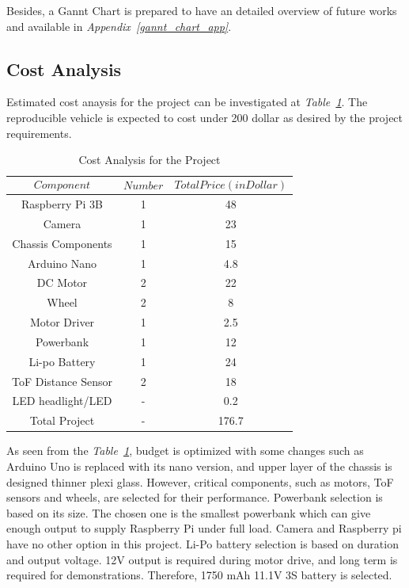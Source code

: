 \documentclass[a4paper,12pt]{article}
\begin{document}
Besides, a Gannt Chart is prepared to have an detailed overview of future works and available in \textit{Appendix~\ref{gannt_chart_app}}.
	
	
	
	
	\subsection{Cost Analysis}
		Estimated cost anaysis for the project can be investigated at \textit{Table~\ref{tab:cost}}. The reproducible vehicle is expected to cost under 200 dollar as desired by the project requirements.
	
	\begin{table}[H]
  \centering
 	
 	\caption{Cost Analysis for the Project}
    \begin{tabular}{c|c|c}
       $$Component$$ & $$Number$$ & $$Total Price (in Dollar)$$  \\ \hline
       Raspberry Pi 3B & 1 & 48   \\ \hline
       Camera & 1 & 23   \\ \hline
       Chassis Components & 1 & 15   \\ \hline
       Arduino Nano & 1 &  4.8 \\ \hline
       DC Motor & 2 & 22 \\ \hline
       Wheel & 2 & 8 \\ \hline
       Motor Driver & 1 &  2.5 \\ \hline
       Powerbank & 1 & 12 \\ \hline
       Li-po Battery  & 1 & 24 \\ \hline
       ToF Distance Sensor & 2 & 18 \\ \hline
       LED headlight/LED & - & 0.2 \\ \hline
       Total Project & - & 176.7 
         
  
  \end{tabular} 
  \label{tab:cost}
    
\end{table}

	As seen from the \textit{Table~\ref{tab:cost}}, budget is optimized with some changes such as Arduino Uno is replaced with its nano version, and upper layer of the chassis is designed thinner plexi glass. However, critical components, such as motors, ToF sensors and wheels, are selected for their performance. Powerbank selection is based on its size. The chosen one is the smallest powerbank which can give enough output to supply Raspberry Pi under full load. Camera and Raspberry pi have no other option in this project. Li-Po battery selection is based on duration and output voltage. 12V output is required during motor drive, and long term is required for demonstrations. Therefore, 1750 mAh 11.1V 3S battery is selected. 
  
\end{document}
